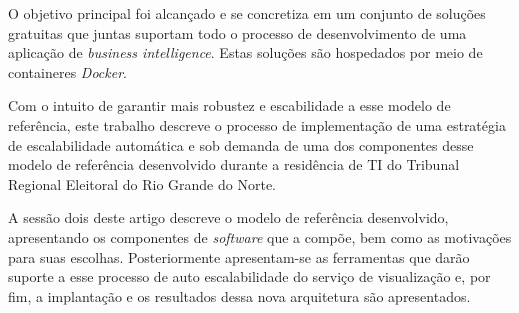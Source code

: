 O objetivo principal foi alcançado e se concretiza em um conjunto de soluções gratuitas que juntas suportam todo o processo de desenvolvimento de uma aplicação de \textit{business intelligence}. Estas soluções são hospedados por meio de containeres \textit{Docker}.

Com o intuito de garantir mais robustez e escabilidade a esse modelo de referência, este trabalho descreve o processo de implementação de uma estratégia de escalabilidade automática e sob demanda de uma dos componentes desse modelo de referência desenvolvido durante a residência de TI do Tribunal Regional Eleitoral do Rio Grande do Norte.  

A sessão dois deste artigo descreve o modelo de referência desenvolvido, apresentando os componentes de \textit{software} que a compõe, bem como as motivações para suas escolhas. Posteriormente apresentam-se as ferramentas que darão suporte a esse processo de auto escalabilidade do serviço de visualização e, por fim, a implantação e os resultados dessa nova arquitetura são apresentados.